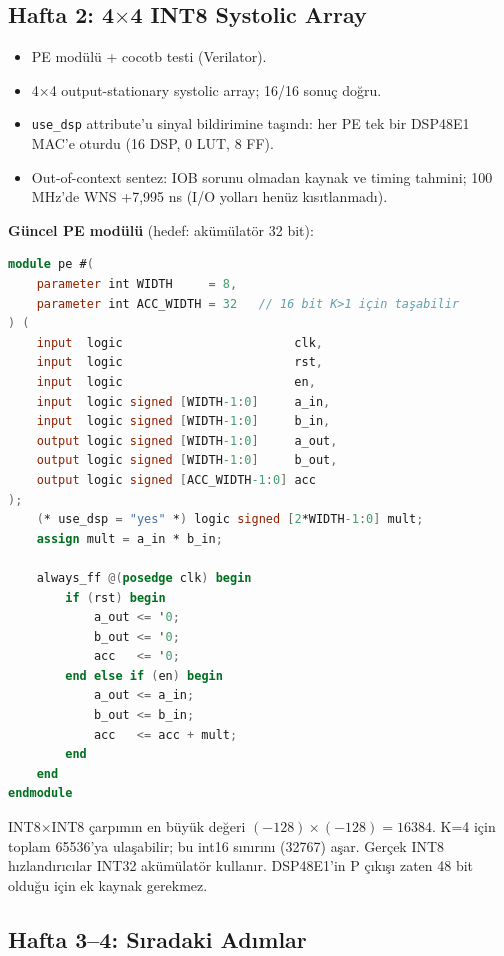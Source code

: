 \documentclass[11pt,a4paper]{article}
\begin{document}
\subsection{Hafta 2: 4$\times$4 INT8 Systolic Array}

\begin{itemize}
    \item PE modülü + cocotb testi (Verilator).
    \item 4$\times$4 output-stationary systolic array; 16/16 sonuç doğru.
    \item \texttt{use\_dsp} attribute'u sinyal bildirimine taşındı: her PE tek bir DSP48E1 MAC'e oturdu (16 DSP, 0 LUT, 8 FF).
    \item Out-of-context sentez: IOB sorunu olmadan kaynak ve timing tahmini; 100 MHz'de WNS +7,995 ns (I/O yolları henüz kısıtlanmadı).
\end{itemize}

\textbf{Güncel PE modülü} (hedef: akümülatör 32 bit):

\begin{lstlisting}[language=Verilog]
module pe #(
    parameter int WIDTH     = 8,
    parameter int ACC_WIDTH = 32   // 16 bit K>1 için taşabilir
) (
    input  logic                        clk,
    input  logic                        rst,
    input  logic                        en,
    input  logic signed [WIDTH-1:0]     a_in,
    input  logic signed [WIDTH-1:0]     b_in,
    output logic signed [WIDTH-1:0]     a_out,
    output logic signed [WIDTH-1:0]     b_out,
    output logic signed [ACC_WIDTH-1:0] acc
);
    (* use_dsp = "yes" *) logic signed [2*WIDTH-1:0] mult;
    assign mult = a_in * b_in;

    always_ff @(posedge clk) begin
        if (rst) begin
            a_out <= '0;
            b_out <= '0;
            acc   <= '0;
        end else if (en) begin
            a_out <= a_in;
            b_out <= b_in;
            acc   <= acc + mult;
        end
    end
endmodule
\end{lstlisting}

\begin{warnbox}
INT8$\times$INT8 çarpımın en büyük değeri $(-128)\times(-128)=16384$. K=4 için toplam 65536'ya ulaşabilir; bu int16 sınırını (32767) aşar. Gerçek INT8 hızlandırıcılar INT32 akümülatör kullanır. DSP48E1'in P çıkışı zaten 48 bit olduğu için ek kaynak gerekmez.
\end{warnbox}

\subsection{Hafta 3--4: Sıradaki Adımlar}
\end{document}
